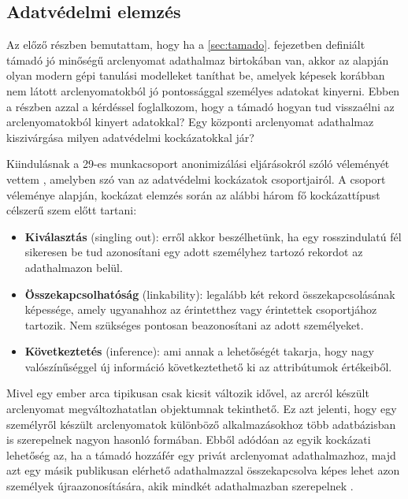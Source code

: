 \subsection{Adatvédelmi elemzés} %
\label{sec:adatvedelmi_elemz}

Az előző részben bemutattam, hogy ha a \ref{sec:tamado}. fejezetben definiált támadó jó minőségű arclenyomat adathalmaz birtokában van, akkor az alapján olyan modern gépi tanulási modelleket taníthat be, amelyek képesek korábban nem látott arclenyomatokból jó pontossággal személyes adatokat kinyerni. Ebben a részben azzal a kérdéssel foglalkozom, hogy a támadó hogyan tud visszaélni az arclenyomatokból kinyert adatokkal? Egy központi arclenyomat adathalmaz kiszivárgása milyen adatvédelmi kockázatokkal jár?

Kiindulásnak a 29-es munkacsoport anonimizálási eljárásokról szóló véleményét vettem \cite{anon2014}, amelyben szó van az adatvédelmi kockázatok csoportjairól. A csoport véleménye alapján, kockázat elemzés során az alábbi három fő kockázattípust célszerű szem előtt tartani:

\begin{itemize}
	\item \textbf{Kiválasztás} (singling out): erről akkor beszélhetünk, ha egy rosszindulatú fél sikeresen be tud azonosítani egy adott személyhez tartozó rekordot az adathalmazon belül.
	\item \textbf{Összekapcsolhatóság} (linkability): legalább két rekord összekapcsolásának képessége, amely ugyanahhoz az érintetthez vagy érintettek csoportjához tartozik. Nem szükséges pontosan beazonosítani az adott személyeket.
	\item \textbf{Következtetés} (inference): ami annak a lehetőségét takarja, hogy nagy valószínűséggel új információ következtethető ki az attribútumok értékeiből.
\end{itemize}

Mivel egy ember arca tipikusan csak kicsit változik idővel, az arcról készült arclenyomat megváltozhatatlan objektumnak tekinthető. Ez azt jelenti, hogy egy személyről készült arclenyomatok különböző alkalmazásokhoz több adatbázisban is szerepelnek nagyon hasonló formában. Ebből adódóan az egyik kockázati lehetőség az, ha a támadó hozzáfér egy privát arclenyomat adathalmazhoz, majd azt egy másik publikusan elérhető adathalmazzal összekapcsolva képes lehet azon személyek újraazonosítására, akik mindkét adathalmazban szerepelnek \cite{fabian2020anon}.

